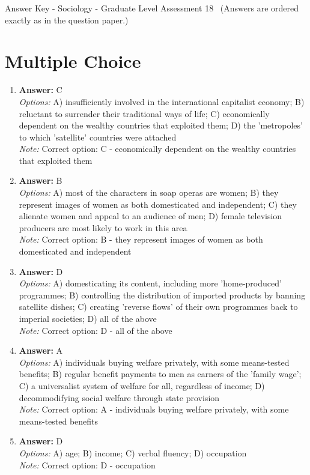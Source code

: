 \documentclass[12pt]{article}
\begin{document}
\begin{center}
Answer Key - Sociology - Graduate Level Assessment 18 \
\small (Answers are ordered exactly as in the question paper.)
\end{center}

\section*{Multiple Choice}
\begin{enumerate}[label=\arabic*.]
\item \textbf{Answer:} C
\\ \textit{Options:} A) insufficiently involved in the international capitalist economy; B) reluctant to surrender their traditional ways of life; C) economically dependent on the wealthy countries that exploited them; D) the 'metropoles' to which 'satellite' countries were attached
\\ \textit{Note:} Correct option: C - economically dependent on the wealthy countries that exploited them
\item \textbf{Answer:} B
\\ \textit{Options:} A) most of the characters in soap operas are women; B) they represent images of women as both domesticated and independent; C) they alienate women and appeal to an audience of men; D) female television producers are most likely to work in this area
\\ \textit{Note:} Correct option: B - they represent images of women as both domesticated and independent
\item \textbf{Answer:} D
\\ \textit{Options:} A) domesticating its content, including more 'home-produced' programmes; B) controlling the distribution of imported products by banning satellite dishes; C) creating 'reverse flows' of their own programmes back to imperial societies; D) all of the above
\\ \textit{Note:} Correct option: D - all of the above
\item \textbf{Answer:} A
\\ \textit{Options:} A) individuals buying welfare privately, with some means-tested benefits; B) regular benefit payments to men as earners of the 'family wage'; C) a universalist system of welfare for all, regardless of income; D) decommodifying social welfare through state provision
\\ \textit{Note:} Correct option: A - individuals buying welfare privately, with some means-tested benefits
\item \textbf{Answer:} D
\\ \textit{Options:} A) age; B) income; C) verbal fluency; D) occupation
\\ \textit{Note:} Correct option: D - occupation
\end{enumerate}
\end{document}
